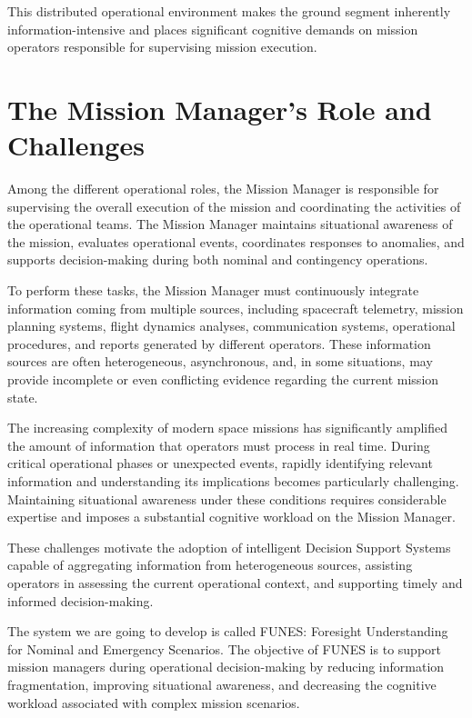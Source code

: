 This distributed operational environment makes the ground segment inherently information-intensive and places significant cognitive demands on mission operators responsible for supervising mission execution.


\section{The Mission Manager's Role and Challenges}

Among the different operational roles, the Mission Manager is responsible for supervising the overall execution of the mission and coordinating the activities of the operational teams. The Mission Manager maintains situational awareness of the mission, evaluates operational events, coordinates responses to anomalies, and supports decision-making during both nominal and contingency operations.

To perform these tasks, the Mission Manager must continuously integrate information coming from multiple sources, including spacecraft telemetry, mission planning systems, flight dynamics analyses, communication systems, operational procedures, and reports generated by different operators. These information sources are often heterogeneous, asynchronous, and, in some situations, may provide incomplete or even conflicting evidence regarding the current mission state.

The increasing complexity of modern space missions has significantly amplified the amount of information that operators must process in real time. During critical operational phases or unexpected events, rapidly identifying relevant information and understanding its implications becomes particularly challenging. Maintaining situational awareness under these conditions requires considerable expertise and imposes a substantial cognitive workload on the Mission Manager.

These challenges motivate the adoption of intelligent Decision Support Systems capable of aggregating information from heterogeneous sources, assisting operators in assessing the current operational context, and supporting timely and informed decision-making.

The system we are going to develop is called FUNES: Foresight Understanding for Nominal and Emergency Scenarios. The objective of FUNES is to support mission managers during operational decision-making by reducing information fragmentation, improving situational awareness, and decreasing the cognitive workload associated with complex mission scenarios.

